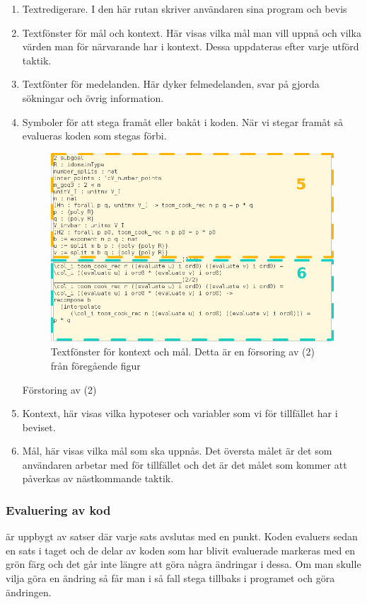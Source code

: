 \begin{enumerate}
\item Textredigerare. I den här rutan skriver användaren sina program och bevis
\item Textfönster för mål och kontext. Här visas vilka mål man vill uppnå och
  vilka värden man för närvarande har i kontext. Dessa uppdateras efter varje
  utförd taktik.
\item Textfönter för medelanden. Här dyker felmedelanden, svar på
  gjorda sökningar och övrig information.
\item Symboler för att stega framåt eller bakåt i koden. När vi stegar framåt
  så evalueras koden som stegas förbi.


\begin{figure}[h!]
  \centering
  \includegraphics[width=150mm]{../images/Kontext}
  \caption[Fönster för kontext och mål]
   {Textfönster för kontext och mål. Detta är en försoring av (2) från
     föregående figur}
\end{figure}

Förstoring av (2)
\item Kontext, här visas vilka hypoteser och variabler som vi för tillfället
  har i beviset.
\item Mål, här visas vilka mål som ska uppnås. Det översta målet är det som
  användaren arbetar med för tillfället och det är det målet som kommer att
  påverkas av nästkommande taktik.
\end{enumerate}


\subsubsection{Evaluering av kod}
\coq är uppbygt av satser där varje sats avslutas med en punkt.
Koden evaluers sedan en sats i taget och de delar av koden som
har blivit evaluerade markeras med en grön färg och det går inte längre
att göra några ändringar i dessa. Om man skulle vilja göra en ändring så
får man i så fall stega tillbaks i programet och göra ändringen.

